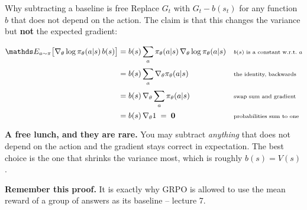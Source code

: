 \documentclass[aspectratio=169]{beamer}
\begin{document}
\begin{frame}{Why subtracting a baseline is free}
  \small
  Replace $G_t$ with $G_t - b(s_t)$ for any function $b$ that does not depend on the action.
  The claim is that this changes the variance but \textbf{not} the expected gradient:

  \vskip 4pt
  \begin{tcolorbox}[colback=lightbg, colframe=popblue, boxrule=0.7pt, arc=2pt]
    \footnotesize
    \begin{align*}
      \E_{a \sim \pi}\big[ \nabla_\theta \log \pi_\theta(a|s)\, b(s) \big]
        &= b(s) \sum_a \pi_\theta(a|s)\, \nabla_\theta \log \pi_\theta(a|s)
        && \text{\scriptsize $b(s)$ is a constant w.r.t.\ $a$} \\[2pt]
        &= b(s) \sum_a \nabla_\theta \pi_\theta(a|s)
        && \text{\scriptsize the identity, backwards} \\[2pt]
        &= b(s)\, \nabla_\theta \sum_a \pi_\theta(a|s)
        && \text{\scriptsize swap sum and gradient} \\[2pt]
        &= b(s)\, \nabla_\theta 1 \;=\; \mathbf{0}
        && \text{\scriptsize probabilities sum to one}
    \end{align*}
  \end{tcolorbox}

  \vskip 4pt
  \begin{tcolorbox}[colback=paramgreen!8, colframe=paramgreen, boxrule=0.6pt, arc=2pt]
    \small
    \textbf{A free lunch, and they are rare.} You may subtract \emph{anything} that does not
    depend on the action and the gradient stays correct in expectation. The best choice is the
    one that shrinks the variance most, which is roughly $b(s) = V(s)$.

    \vskip 3pt
    \textbf{Remember this proof.} It is exactly why GRPO is allowed to use the mean reward of a
    group of answers as its baseline -- lecture 7.
  \end{tcolorbox}
\end{frame}
\end{document}
